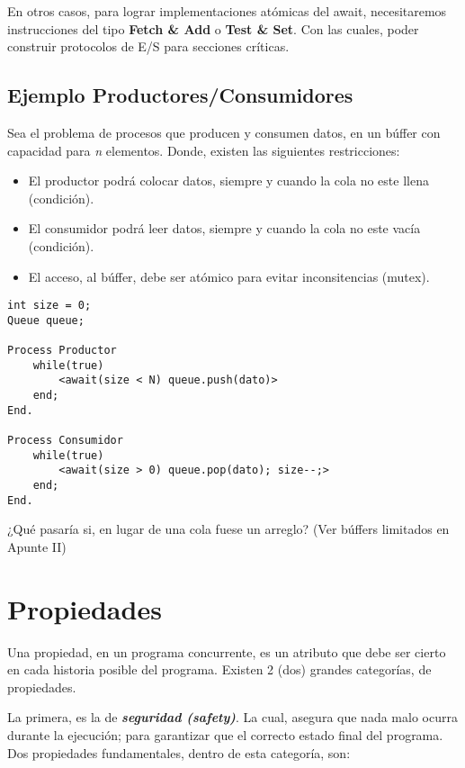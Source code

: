 \documentclass[a4paper, 10pt]{report}
\begin{document}
En otros casos, para lograr implementaciones atómicas del await, necesitaremos instrucciones del tipo \textbf{Fetch \& Add} o \textbf{Test \& Set}. Con las cuales, poder construir protocolos de E/S para secciones críticas.

\subsection{Ejemplo Productores/Consumidores}

Sea el problema de procesos que producen y consumen datos, en un búffer con capacidad para \emph{n} elementos. Donde, existen las siguientes restricciones:

\begin{itemize}
	\item El productor podrá colocar datos, siempre y cuando la cola no este llena (condición).
	\item El consumidor podrá leer datos, siempre y cuando la cola no este vacía (condición).
	\item El acceso, al búffer, debe ser atómico para evitar inconsitencias (mutex).
\end{itemize}

\begin{lstlisting}
int size = 0;
Queue queue;
	
Process Productor
	while(true)
		<await(size < N) queue.push(dato)>
	end;
End.

Process Consumidor
	while(true)
		<await(size > 0) queue.pop(dato); size--;>
	end;
End.
\end{lstlisting}

\begin{basic_box}
	 ¿Qué pasaría si, en lugar de una cola fuese un arreglo? (Ver búffers limitados en Apunte II)
\end{basic_box}

\section{Propiedades}

Una propiedad, en un programa concurrente, es un atributo que debe ser cierto en cada historia posible del programa. Existen 2 (dos) grandes categorías, de propiedades.

La primera, es la de \textbf{\emph{seguridad (safety)}}. La cual, asegura que nada malo ocurra durante la ejecución; para garantizar que el correcto estado final del programa. Dos propiedades fundamentales, dentro de esta categoría, son:
\end{document}
